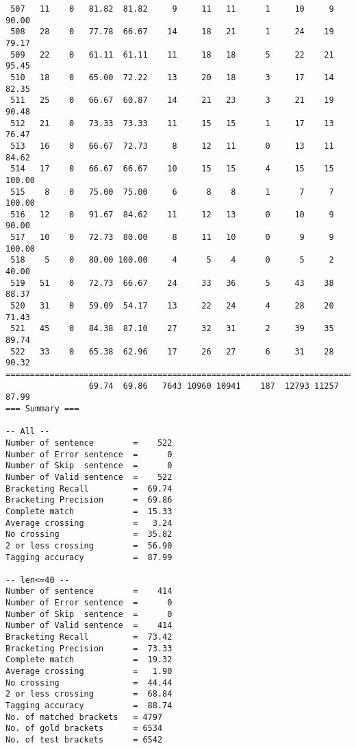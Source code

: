 \begin{verbatim}
 507   11    0   81.82  81.82     9     11   11      1     10     9    90.00
 508   28    0   77.78  66.67    14     18   21      1     24    19    79.17
 509   22    0   61.11  61.11    11     18   18      5     22    21    95.45
 510   18    0   65.00  72.22    13     20   18      3     17    14    82.35
 511   25    0   66.67  60.87    14     21   23      3     21    19    90.48
 512   21    0   73.33  73.33    11     15   15      1     17    13    76.47
 513   16    0   66.67  72.73     8     12   11      0     13    11    84.62
 514   17    0   66.67  66.67    10     15   15      4     15    15   100.00
 515    8    0   75.00  75.00     6      8    8      1      7     7   100.00
 516   12    0   91.67  84.62    11     12   13      0     10     9    90.00
 517   10    0   72.73  80.00     8     11   10      0      9     9   100.00
 518    5    0   80.00 100.00     4      5    4      0      5     2    40.00
 519   51    0   72.73  66.67    24     33   36      5     43    38    88.37
 520   31    0   59.09  54.17    13     22   24      4     28    20    71.43
 521   45    0   84.38  87.10    27     32   31      2     39    35    89.74
 522   33    0   65.38  62.96    17     26   27      6     31    28    90.32
============================================================================
                 69.74  69.86   7643 10960 10941    187  12793 11257    87.99
=== Summary ===

-- All --
Number of sentence        =    522
Number of Error sentence  =      0
Number of Skip  sentence  =      0
Number of Valid sentence  =    522
Bracketing Recall         =  69.74
Bracketing Precision      =  69.86
Complete match            =  15.33
Average crossing          =   3.24
No crossing               =  35.82
2 or less crossing        =  56.90
Tagging accuracy          =  87.99

-- len<=40 --
Number of sentence        =    414
Number of Error sentence  =      0
Number of Skip  sentence  =      0
Number of Valid sentence  =    414
Bracketing Recall         =  73.42
Bracketing Precision      =  73.33
Complete match            =  19.32
Average crossing          =   1.90
No crossing               =  44.44
2 or less crossing        =  68.84
Tagging accuracy          =  88.74
No. of matched brackets   = 4797
No. of gold brackets      = 6534
No. of test brackets      = 6542

\end{verbatim}

\normalsize

